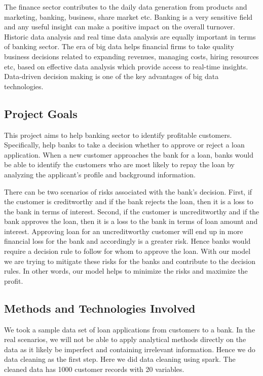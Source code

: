 \documentclass[sigconf]{acmart}
\begin{document}
The finance sector contributes to the daily data generation from products and marketing, banking, business, share market etc. Banking is a very sensitive field and any useful insight can make a positive impact on the overall turnover. Historic data analysis and real time data analysis are equally important in terms of banking sector. The era of big data helps financial firms to take quality business decisions related to expanding revenues, managing costs, hiring resources etc, based on effective data analysis which provide access to real-time insights. Data-driven decision making is one of the key advantages of big data technologies.

\subsection{Project Goals}

This project aims to help banking sector to identify profitable customers. Specifically, help banks to take a decision whether to approve or reject a loan application. When a new customer approaches the bank for a loan, banks would be able to identify the customers who are most likely to repay the loan by analyzing the applicant's profile and background information. 

There can be two scenarios of risks associated with the bank's decision. First, if the customer is creditworthy and if the bank rejects the loan, then it is a loss to the bank in terms of interest. Second, if the customer is uncreditworthy and if the bank approves the loan, then it is a loss to the bank in terms of loan amount and interest. Approving loan for an uncreditworthy customer will end up in more financial loss for the bank and accordingly is a greater risk. Hence banks would require a decision rule to follow for whom to approve the loan. With our model we are trying to mitigate these risks for the banks and contribute to the decision rules. In other words, our model helps to minimize the risks and maximize the profit.

\subsection{Methods and Technologies Involved}

We took a sample data set of loan applications from customers to a bank. In the real scenarios, we will not be able to apply analytical methods directly on the data as it likely be imperfect and containing irrelevant information. Hence we do data cleaning as the first step. Here we did data cleaning using spark. The cleaned data has 1000 customer records with 20 variables.
\end{document}
